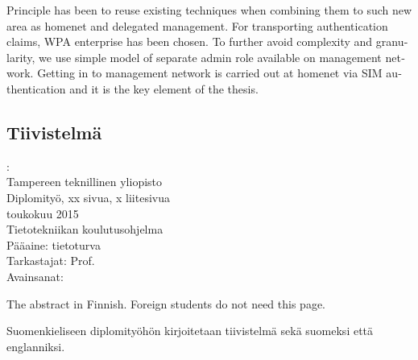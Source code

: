 \documentclass[12pt,a4paper,english]{tutthesis}
\begin{document}
\begin{otherlanguage}{english}
Principle %
has been to reuse existing techniques when combining them to such new area as 
homenet and delegated management.
 For transporting authentication claims, WPA enterprise has been chosen. 
To further avoid complexity and granularity, we
use simple model of separate admin role available on
management network. Getting in to management network is carried out at
homenet via SIM authentication and it is the key element of the thesis.



\end{otherlanguage} %

\begin{otherlanguage}{finnish} %
\chapter*{Tiivistelmä}         %

\begin{spacing}{1.0}
         {\bf \textsf{\MakeUppercase{\@author}}}: \@titleB\\  %
         \textsf{Tampereen teknillinen yliopisto}\\
         \textsf{Diplomityö, xx sivua, x liitesivua}\\ %
         \textsf{toukokuu 2015}\\
         \textsf{Tietotekniikan koulutusohjelma}\\
         \textsf{Pääaine: tietoturva}\\
         \textsf{Tarkastajat:  Prof. \@examiner}\\ %
         \textsf{Avainsanat: }\\
\end{spacing}
The abstract in Finnish. Foreign students do not need this page.

Suomenkieliseen diplomityöhön kirjoitetaan tiivistelmä sekä suomeksi
että englanniksi.

\end{otherlanguage} %
\end{document}

